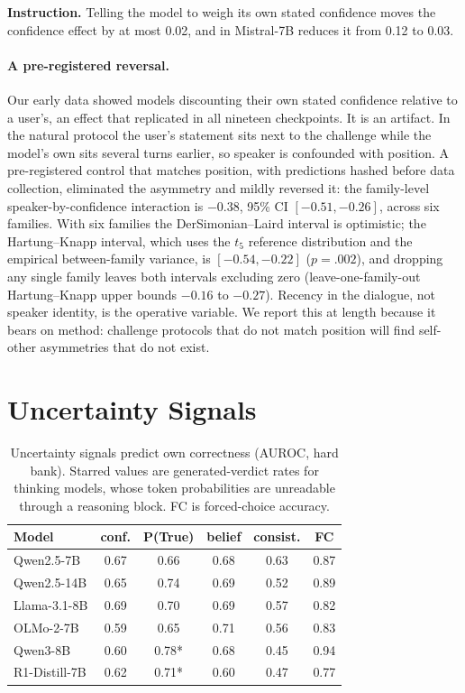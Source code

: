 \documentclass{article}
\begin{document}
\textbf{Instruction.} Telling the model to weigh its own stated confidence moves the confidence effect by at most 0.02, and in Mistral-7B reduces it from 0.12 to 0.03.

\paragraph{A pre-registered reversal.}
Our early data showed models discounting their own stated confidence relative to a user's, an effect that replicated in all nineteen checkpoints. It is an artifact. In the natural protocol the user's statement sits next to the challenge while the model's own sits several turns earlier, so speaker is confounded with position. A pre-registered control that matches position, with predictions hashed before data collection, eliminated the asymmetry and mildly reversed it: the family-level speaker-by-confidence interaction is $-0.38$, 95\% CI $[-0.51, -0.26]$, across six families. With six families the DerSimonian--Laird interval is optimistic; the Hartung--Knapp interval, which uses the $t_{5}$ reference distribution and the empirical between-family variance, is $[-0.54,-0.22]$ ($p=.002$), and dropping any single family leaves both intervals excluding zero (leave-one-family-out Hartung--Knapp upper bounds $-0.16$ to $-0.27$). Recency in the dialogue, not speaker identity, is the operative variable. We report this at length because it bears on method: challenge protocols that do not match position will find self-other asymmetries that do not exist.


\section{Uncertainty Signals}
\label{app:signals}
\begin{table}[t]
\caption{Uncertainty signals predict own correctness (AUROC, hard bank). Starred values are generated-verdict rates for thinking models, whose token probabilities are unreadable through a reasoning block. FC is forced-choice accuracy.}
\label{tab:signals}
\vskip 0.1in
\centering
\small
\begin{tabular}{lccccc}
\toprule
Model & conf. & P(True) & belief & consist. & FC \\
\midrule
Qwen2.5-7B & 0.67 & 0.66 & 0.68 & 0.63 & 0.87 \\
Qwen2.5-14B & 0.65 & 0.74 & 0.69 & 0.52 & 0.89 \\
Llama-3.1-8B & 0.69 & 0.70 & 0.69 & 0.57 & 0.82 \\
OLMo-2-7B & 0.59 & 0.65 & 0.71 & 0.56 & 0.83 \\
Qwen3-8B & 0.60 & 0.78* & 0.68 & 0.45 & 0.94 \\
R1-Distill-7B & 0.62 & 0.71* & 0.60 & 0.47 & 0.77 \\
\bottomrule
\end{tabular}
\vskip -0.1in
\end{table}
\end{document}
